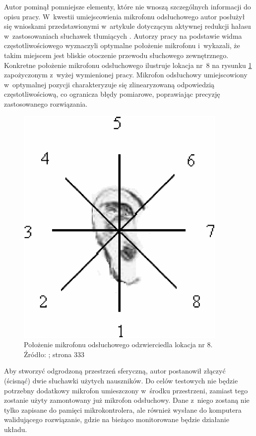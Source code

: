 Autor pominął pomniejsze elementy, które nie wnoszą szczególnych informacji do opisu pracy. W~kwestii umiejscowienia mikrofonu odsłuchowego autor posłużył się wnioskami przedstawionymi w~artykule dotyczącym aktywnej redukcji hałasu w~zastosowaniach słuchawek tłumiących \cite{ANC4HP}. Autorzy pracy na podstawie widma częstotliwościowego wyznaczyli optymalne położenie mikrofonu i~wykazali, że takim miejscem jest bliskie otoczenie przewodu słuchowego zewnętrznego. Konkretne położenie mikrofonu odsłuchowego ilustruje lokacja nr~8 na rysunku \ref{fig:error_mic_placement} zapożyczonym z~wyżej wymienionej pracy.
Mikrofon odsłuchowy umiejscowiony w~optymalnej pozycji charakteryzuje się zlinearyzowaną odpowiedzią częstotliwościową, co ogranicza błędy pomiarowe, poprawiając precyzję zastosowanego rozwiązania.
\begin{figure}[h!]
	\centering
	\includegraphics[scale=0.6]{../Assets/error_mic_placement.png}
	\caption{Położenie mikrofonu odsłuchowego odzwierciedla lokacja nr 8.\\ Źródło: ; strona 333}
	\label{fig:error_mic_placement}
\end{figure}

Aby stworzyć odgrodzoną przestrzeń sferyczną, autor postanowił złączyć (ścisnąć) dwie słuchawki użytych nauszników. Do celów testowych nie będzie potrzebny dodatkowy mikrofon umieszczony w~środku przestrzeni, zamiast tego zostanie użyty zamontowany już mikrofon odsłuchowy. Dane z~niego zostaną nie tylko zapisane do pamięci mikrokontrolera, ale również wysłane do komputera walidującego rozwiązanie, gdzie na bieżąco monitorowane będzie działanie układu.

